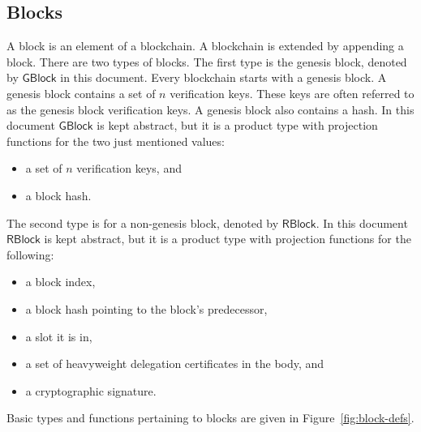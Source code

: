 \documentclass[11pt,a4paper]{article}
\newcommand{\type}[1]{\mathsf{#1}}
\newcommand{\GBlock}{\type{GBlock}}
\newcommand{\RBlock}{\type{RBlock}}
\begin{document}
\subsection{Blocks}
\label{sec:blocks}

A block is an element of a blockchain.
%
A blockchain is extended by appending a block.
%
There are two types of blocks.
%
The first type is the genesis block, denoted by $\GBlock$ in this document.
%
Every blockchain starts with a genesis block.
%
A genesis block contains a set of $n$ verification keys.
%
These keys are often referred to as the genesis block verification keys.
%
A genesis block also contains a hash.
%
In this document $\GBlock$ is kept abstract, but it is a product type with
projection functions for the two just mentioned values:
%
\begin{itemize}
\item a set of $n$ verification keys, and
\item a block hash.
\end{itemize}

The second type is for a non-genesis block, denoted by $\RBlock$.
%
In this document $\RBlock$ is kept abstract, but it is a product type with
projection functions for the following:
%
\begin{itemize}
\item a block index,
\item a block hash pointing to the block's predecessor,
\item a slot it is in,
\item a set of heavyweight delegation certificates in the body, and
\item a cryptographic signature.
\end{itemize}


Basic types and functions pertaining to blocks are given in
Figure~\ref{fig:block-defs}.
\end{document}
